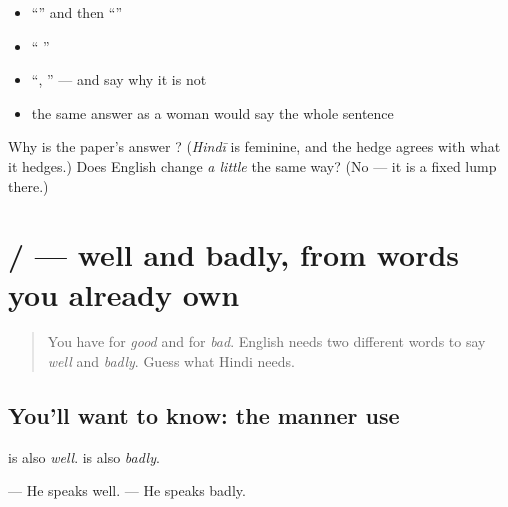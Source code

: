 \begin{itemize}
\raggedright
  \item \textquotedblleft{}\textquotedblright{} and then \textquotedblleft{}\textquotedblright{}
  \item \textquotedblleft{}    \textquotedblright{}
  \item \textquotedblleft{}, \textquotedblright{} — and say why it is not \textbf{}
  \item the same answer as a woman would say the whole sentence
\end{itemize}

\begin{tcolorbox}[breakable,colback=teal!4,colframe=teal!35!black,title={Before you move on}]
Why is the paper's answer \textbf{}? (\emph{Hindī} is feminine, and the hedge agrees with what it hedges.) Does English change \emph{a little} the same way? (No — it is a fixed lump there.)
\end{tcolorbox}
\section[\texorpdfstring{\hi{अच्छा} / \hi{बुरा} (acchā / burā)}{अच्छा / बुरा (acchā / burā)}]{ /  — well and badly, from words you already own}

\label{lesson:HI-C92-achchha-buraa}



\begin{quote}
You have \textbf{} for \emph{good} and \textbf{} for \emph{bad}. English needs two different words to say \emph{well} and \emph{badly}. Guess what Hindi needs.
\end{quote}

\subsection*{You'll want to know: the manner use}
\textbf{} is also \emph{well}. \textbf{} is also \emph{badly}.

\textbf{   } — He speaks well. \textbf{   } — He speaks badly.

